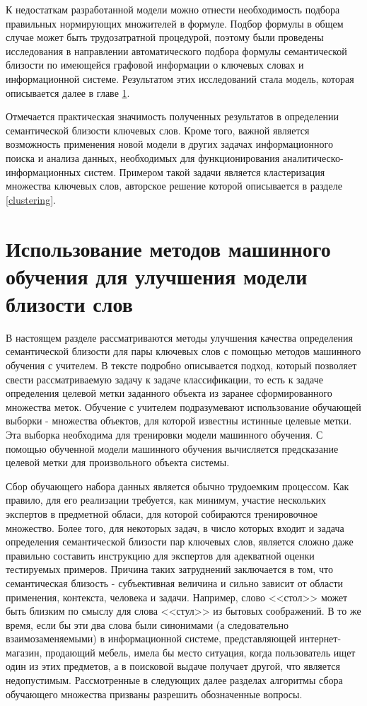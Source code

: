 К недостаткам разработанной модели можно отнести необходимость подбора правильных нормирующих множителей в формуле. Подбор формулы в общем случае может быть трудозатратной процедурой, поэтому были проведены исследования в направлении автоматического подбора формулы семантической близости по имеющейся графовой информации о ключевых словах и информационной системе. Результатом этих исследований стала модель, которая описывается далее в главе \ref{ml_sim}.

Отмечается практическая значимость полученных результатов в определении семантической близости ключевых слов. Кроме того, важной является возможность применения новой модели в других задачах информационного поиска и анализа данных, необходимых для функционирования аналитическо-информационных систем. Примером такой задачи является кластеризация множества ключевых слов, авторское решение которой описывается в разделе \ref{clustering}.

\section{Использование методов машинного обучения для улучшения модели близости слов} \label{ml_sim}

В настоящем разделе рассматриваются методы улучшения качества определения семантической близости для пары ключевых слов с помощью методов машинного обучения с учителем. В тексте подробно описывается подход, который позволяет свести рассматриваемую задачу к задаче классификации, то есть к задаче определения целевой метки заданного объекта из заранее сформированного множества меток. Обучение с учителем подразумевают использование обучающей выборки - множества объектов, для которой известны истинные целевые метки. Эта выборка необходима для тренировки модели машинного обучения. С помощью обученной модели машинного обучения вычисляется предсказание целевой метки для произвольного объекта системы.

Сбор обучающего набора данных является обычно трудоемким процессом. Как правило, для его реализации требуется, как минимум, участие нескольких экспертов в предметной обласи, для которой собираются тренировочное множество. Более того, для некоторых задач, в число которых входит и задача определения семантической близости пар ключевых слов, является сложно даже правильно составить инструкцию для экспертов для адекватной оценки тестируемых примеров. Причина таких затруднений заключается в том, что семантическая близость - субъективная величина и сильно зависит от области применения, контекста, человека и задачи. Например, слово <<стол>> может быть близким по смыслу для слова <<стул>> из бытовых соображений. В то же время, если бы эти два слова были синонимами (а следовательно взаимозаменяемыми) в информационной системе, представляющей интернет-магазин, продающий мебель, имела бы место ситуация, когда пользователь ищет один из этих предметов, а в поисковой выдаче получает другой, что является недопустимым. Рассмотренные в следующих далее разделах алгоритмы сбора обучающего множества призваны разрешить обозначенные вопросы.

